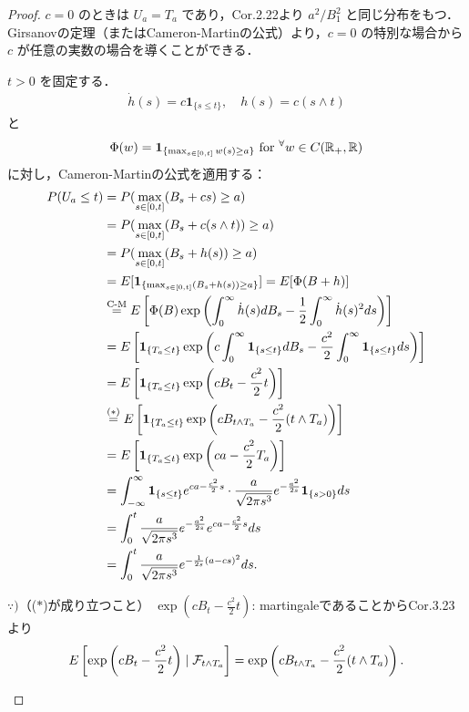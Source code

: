 \documentclass{jsarticle}
\begin{document}
\begin{proof}
    $c=0$ のときは $U_a=T_a$ であり，Cor.2.22より $a^2/B_1^2$ と同じ分布をもつ．
    Girsanovの定理（またはCameron-Martinの公式）より，$c=0$ の特別な場合から $c$ が任意の実数の場合を導くことができる．
    
    $t>0$ を固定する．
    \begin{align}
        \dot{h}(s)=c\bm{1}_{\{s\le t\}},\quad
        h(s)=c(s\wedge t)
    \end{align}
    と
    \begin{align}
        \Phi(w)=\bm{1}_{\{\max_{s\in[0,t]}w(s)\ge a\}}\text{ for }{}^{\forall} w\in C(\mathbb{R}_+,\mathbb{R})
    \end{align}
    に対し，Cameron-Martinの公式を適用する：
    \begin{align}
        P(U_a\le t)
        &= P(\max_{s\in[0,t]}(B_s+cs)\ge a) \\
        &= P(\max_{s\in[0,t]}(B_s+c(s\wedge t))\ge a) \\
        &= P(\max_{s\in[0,t]}(B_s+h(s))\ge a) \\
        &= E[\bm{1}_{\{\max_{s\in[0,t]}(B_s+h(s))\ge a\}}]
        = E[\Phi(B+h)] \\
        &\stackrel{\text{C-M}}{=} E\left[\Phi(B)\exp\left(\int_0^\infty \dot{h}(s)dB_s-\frac{1}{2}\int_0^\infty \dot{h}(s)^2 ds\right)\right] \\
        &= E\left[\bm{1}_{\{T_a\le t\}}\exp\left(c\int_0^\infty \bm{1}_{\{s\le t\}}dB_s-\frac{c^2}{2}\int_0^\infty \bm{1}_{\{s\le t\}} ds\right)\right] \\
        &= E\left[\bm{1}_{\{T_a\le t\}}\exp\left(cB_t-\frac{c^2}{2}t\right)\right] \\
        &\stackrel{(\ast)}{=} E\left[\bm{1}_{\{T_a\le t\}}\exp\left(cB_{t\wedge T_a}-\frac{c^2}{2}(t\wedge T_a)\right)\right] \\
        &= E\left[\bm{1}_{\{T_a\le t\}}\exp\left(ca-\frac{c^2}{2}T_a\right)\right] \\
        &= \int_{-\infty}^{\infty} \bm{1}_{\{s\le t\}}e^{ca-\frac{c^2}{2}s}\cdot\frac{a}{\sqrt{2\pi s^3}}e^{-\frac{a^2}{2s}}\bm{1}_{\{s>0\}}ds \\
        &= \int_0^t \frac{a}{\sqrt{2\pi s^3}}e^{-\frac{a^2}{2s}}e^{ca-\frac{c^2}{2}s}ds \\
        &= \int_0^t \frac{a}{\sqrt{2\pi s^3}}e^{-\frac{1}{2s}(a-cs)^2}ds.
    \end{align}
    
    \begin{screen}
        $\because)$（($\ast$)が成り立つこと）
        $\exp\left(cB_t-\frac{c^2}{2}t\right)$: martingaleであることからCor.3.23より
        \begin{align}
            E\left[\exp\left(cB_t-\frac{c^2}{2}t\right)\mid\mathcal{F}_{t\wedge T_a}\right]
            = \exp\left(cB_{t\wedge T_a}-\frac{c^2}{2}(t\wedge T_a)\right).
        \end{align}
    \end{screen}
    

\end{proof}
\end{document}
